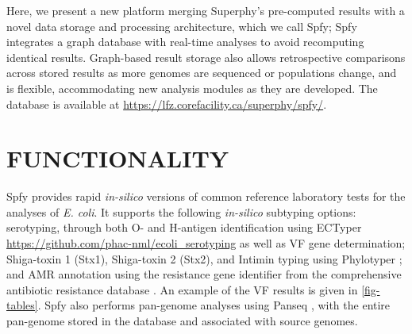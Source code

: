 \documentclass{article}
\begin{document}
Here, we present a new platform merging Superphy's pre-computed results with a novel data storage and processing architecture, which we call Spfy; Spfy integrates a graph database with real-time analyses to avoid recomputing identical results. Graph-based result storage also allows retrospective comparisons across stored results as more genomes are sequenced or populations change, and is flexible, accommodating new analysis modules as they are developed. The database is available at \url{https://lfz.corefacility.ca/superphy/spfy/}.



\enlargethispage{-65.1pt}



\section{FUNCTIONALITY}


Spfy provides rapid \textit{in-silico} versions of common reference laboratory tests for the analyses of \textit{E. coli}. It supports the following \textit{in-silico} subtyping options: serotyping, through both O- and H-antigen identification using ECTyper \url{https://github.com/phac-nml/ecoli_serotyping} as well as VF gene determination; Shiga-toxin 1 (Stx1), Shiga-toxin 2 (Stx2), and Intimin typing using Phylotyper \cite{whiteside2017phylotyper}; and AMR annotation using the resistance gene identifier from the comprehensive antibiotic resistance database \cite{mcarthur2013comprehensive}. An example of the VF results is given in \ref{fig-tables}. Spfy also performs pan-genome analyses using Panseq \cite{laing2010pan}, with the entire pan-genome stored in the database and associated with source genomes.
\end{document}
